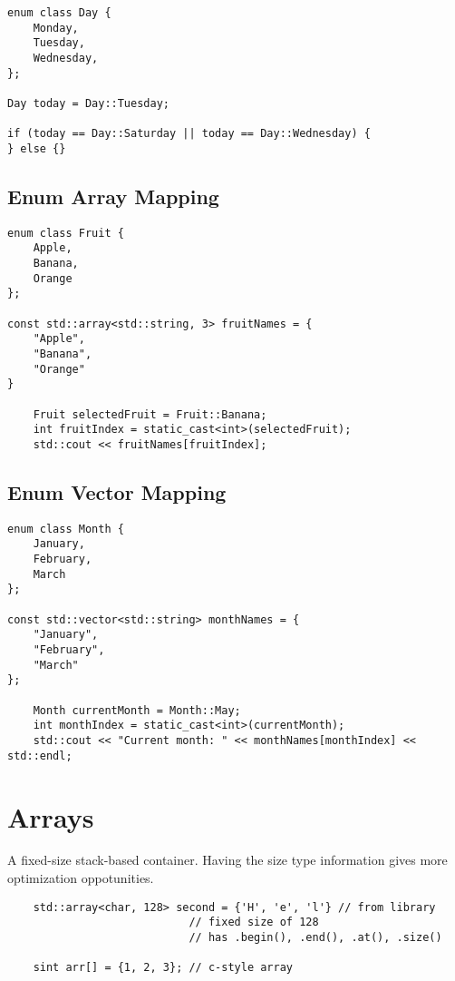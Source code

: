 \begin{verbatim}
enum class Day {
    Monday,
    Tuesday,
    Wednesday,
};

Day today = Day::Tuesday;

if (today == Day::Saturday || today == Day::Wednesday) {
} else {}
\end{verbatim}

\subsection{Enum Array Mapping}

\begin{verbatim}
enum class Fruit {
    Apple,
    Banana,
    Orange
};

const std::array<std::string, 3> fruitNames = {
    "Apple",
    "Banana",
    "Orange"
}

    Fruit selectedFruit = Fruit::Banana;
    int fruitIndex = static_cast<int>(selectedFruit);
    std::cout << fruitNames[fruitIndex];
\end{verbatim}

\subsection{Enum Vector Mapping}

\begin{verbatim}
enum class Month {
    January,
    February,
    March
};

const std::vector<std::string> monthNames = {
    "January",
    "February",
    "March"
};

    Month currentMonth = Month::May;
    int monthIndex = static_cast<int>(currentMonth);
    std::cout << "Current month: " << monthNames[monthIndex] << std::endl;
\end{verbatim}

\section{Arrays}

A fixed-size stack-based container. Having the size type information gives more optimization oppotunities.

\begin{verbatim}
    std::array<char, 128> second = {'H', 'e', 'l'} // from library
                            // fixed size of 128
                            // has .begin(), .end(), .at(), .size() 

    sint arr[] = {1, 2, 3}; // c-style array 
\end{verbatim}

